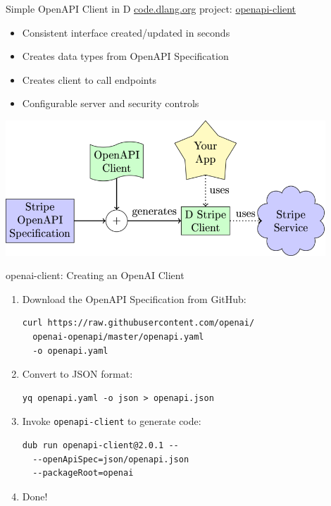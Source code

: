\documentclass[bigger]{beamer}
\begin{document}
\begin{frame}[label={sec:org8b6073b}]{Simple OpenAPI Client in D}
\href{https://code.dlang.org/}{code.dlang.org} project: \href{https://code.dlang.org/packages/openapi-client}{openapi-client}
\begin{itemize}
\item Consistent interface created/updated in seconds
\item Creates data types from OpenAPI Specification
\item Creates client to call endpoints
\item Configurable server and security controls
\end{itemize}

\begin{center}
\includegraphics[width=0.9\textwidth]{openapi-client-flow.png}
\end{center}
\end{frame}

\begin{frame}[label={sec:org57a2626},fragile]{openai-client: Creating an OpenAI Client}
 \begin{enumerate}
\item Download the OpenAPI Specification from GitHub:
\begin{verbatim}
curl https://raw.githubusercontent.com/openai/
  openai-openapi/master/openapi.yaml
  -o openapi.yaml
\end{verbatim}
\item Convert to JSON format:
\begin{verbatim}
yq openapi.yaml -o json > openapi.json
\end{verbatim}
\item Invoke \texttt{openapi-client} to generate code:
\begin{verbatim}
dub run openapi-client@2.0.1 --
  --openApiSpec=json/openapi.json
  --packageRoot=openai
\end{verbatim}
\item Done!
\end{enumerate}
\end{frame}
\end{document}
